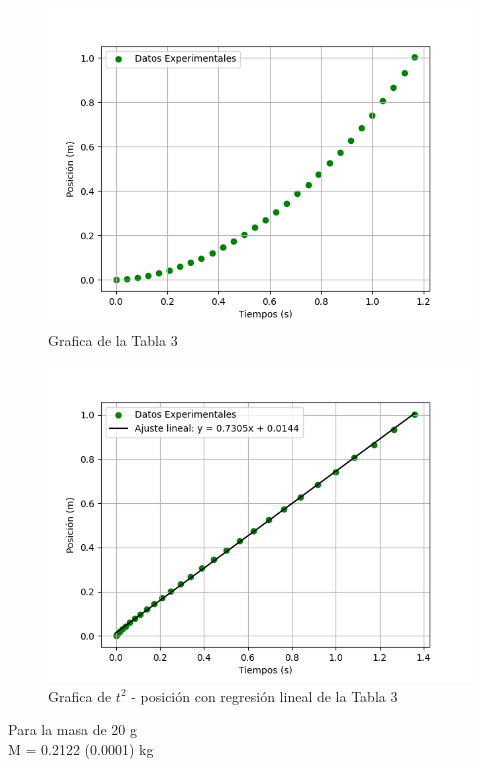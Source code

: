 \documentclass[12pt,a4paper]{article}
\begin{document}
\begin{figure}[h!]
\centering
\includegraphics[scale=0.8]{50 g.png}
\caption{Grafica de la Tabla 3}
\end{figure}

\begin{figure}[h!]
\centering
\includegraphics[scale=0.8]{50 g r.png}
\caption{Grafica de $t^2$ - posición con regresión lineal de la Tabla 3}
\end{figure}

\clearpage


Para la masa de 20 g\\

M = 0.2122 (0.0001) kg \\
\end{document}
